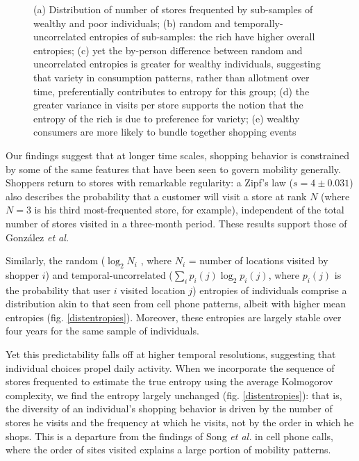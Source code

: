 \documentclass[twocolumn,floatfix]{revtex4}
\begin{document}
\begin{figure*}[!ht]
\centering
{}
\newline
{}
\caption{(a) Distribution of number of stores frequented by sub-samples of wealthy and poor individuals; (b) random and temporally-uncorrelated entropies of sub-samples: the rich have higher overall entropies; (c) yet the by-person difference between random and uncorrelated entropies is greater for wealthy individuals, suggesting that variety in consumption patterns, rather than allotment over time, preferentially contributes to entropy for this group; (d) the greater variance in visits per store supports the notion that the entropy of the rich is due to preference for variety; (e) wealthy consumers are more likely to bundle together shopping events }
\label{decomposition}
\end{figure*}

Our findings suggest that at longer time scales, shopping behavior is constrained by some of the same features that have been seen to govern mobility generally. Shoppers return to stores with remarkable regularity: a Zipf's law ($s=4 \pm 0.031$) also describes the probability that a customer will visit a store at rank $N$ (where $N = 3$ is his third most-frequented store, for example), independent of the total number of stores visited in a three-month period. These results support those of Gonz\'alez {\it et al.}


Similarly, the random ($\log_{2} N_i$ , where $N_i$  = number of locations visited by shopper $i$) and temporal-uncorrelated ($\sum_i p_i (j) \log_2 p_i (j)$, where $p_i (j)$ is the probability that user $i$ visited location $j$) entropies of individuals comprise a distribution akin to that seen from cell phone patterns, albeit with higher mean entropies (fig. \ref{distentropies}). Moreover, these entropies are largely stable over four years for the same sample of individuals.




Yet this predictability falls off at higher temporal resolutions, suggesting that individual choices propel daily activity. When we incorporate the sequence of stores frequented to estimate the true entropy using the average Kolmogorov complexity, we find the entropy largely unchanged (fig. \ref{distentropies}): that is, the diversity of an individual's shopping behavior is driven by the number of stores he visits and the frequency at which he visits, not by the order in which he shops. This is a departure from the findings of Song {\it et al.}  in cell phone calls, where the order of sites visited explains a large portion of mobility patterns. 
\end{document}
